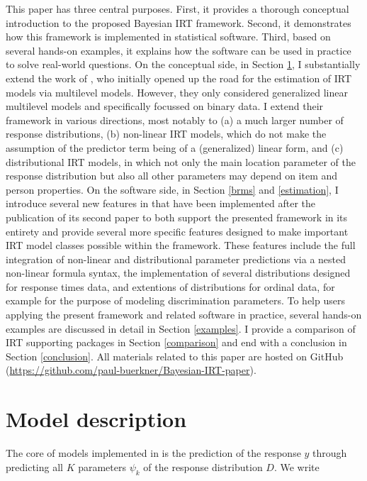 \documentclass[jss]{jss}
\begin{document}
This paper has three central purposes. First, it provides a thorough
conceptual introduction to the proposed Bayesian IRT framework. Second,
it demonstrates how this framework is implemented in statistical
software. Third, based on several hands-on examples, it explains how the
software can be used in practice to solve real-world questions. On the
conceptual side, in Section \ref{model}, I substantially extend the work
of \citet{deboeck2011}, who initially opened up the road for the
estimation of IRT models via multilevel models. However, they only
considered generalized linear multilevel models and specifically
focussed on binary data. I extend their framework in various directions,
most notably to (a) a much larger number of response distributions, (b)
non-linear IRT models, which do not make the assumption of the predictor
term being of a (generalized) linear form, and (c) distributional IRT
models, in which not only the main location parameter of the response
distribution but also all other parameters may depend on item and person
properties. On the software side, in Section \ref{brms} and
\ref{estimation}, I introduce several new features in  that
have been implemented after the publication of its second paper
\citep{brms2} to both support the presented framework in its entirety
and provide several more specific features designed to make important
IRT model classes possible within the framework. These features include
the full integration of non-linear and distributional parameter
predictions via a nested non-linear formula syntax, the implementation
of several distributions designed for response times data, and
extentions of distributions for ordinal data, for example for the
purpose of modeling discrimination parameters. To help users applying
the present framework and related software in practice, several hands-on
examples are discussed in detail in Section \ref{examples}. I provide a
comparison of IRT supporting  packages in Section
\ref{comparison} and end with a conclusion in Section \ref{conclusion}.
All materials related to this paper are hosted on GitHub
(\url{https://github.com/paul-buerkner/Bayesian-IRT-paper}).

\hypertarget{model}{%
\section{Model description}\label{model}}

The core of models implemented in  is the prediction of the
response \(y\) through predicting all \(K\) parameters \(\psi_k\) of the
response distribution \(D\). We write
\end{document}
